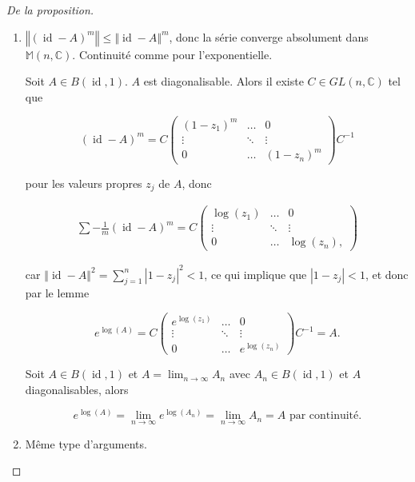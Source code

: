 \documentclass[french]{book}
\theoremstyle{definition}
\newcommand{\lesss}{<}
\newcommand{\less}{\lesss}
\begin{document}
\begin{proof}[De la proposition]

  \

  \begin{enumerate}
    \item \(\left\Vert (\operatorname{id} - A)^{m} \right\Vert \leq \left\Vert \operatorname{id} - A \right\Vert ^{m}\), donc la série converge absolument dans \(\mathbb{M}(n,\mathbb{C})\). Continuité comme pour l'exponentielle.

    Soit \(A \in B(\operatorname{id},1)\). \(A\) est diagonalisable. Alors il existe \(C \in GL(n,\mathbb{C})\) tel que

    \[(\operatorname{id} - A)^{m} = C \begin{pmatrix}
    (1 - z_1)^{m} & \dots & 0 \\
    \vdots & \ddots & \vdots \\
    0 & \dots & (1 - z_n)^{m}
    \end{pmatrix} C ^{-1}\]

    pour les valeurs propres \(z_j\) de \(A\), donc

    \begin{gather*}
      \sum -\frac{1}{m}(\operatorname{id} - A)^{m} = C \begin{pmatrix}
      \log(z_1) & \dots & 0 \\
      \vdots & \ddots & \vdots \\
      0 & \dots & \log(z_n),
      \end{pmatrix}
    \end{gather*}

    car \(\left\Vert \operatorname{id} - A \right\Vert ^{2} = \displaystyle\sum_{j=1}^{n} \left\lvert 1 - z_j \right\rvert ^2 \less 1\), ce qui implique que \(\left\lvert 1 - z_j \right\rvert \less 1\), et donc par le lemme

    \[e^{\log(A)} = C \begin{pmatrix}
    e^{\log(z_1)} & \dots & 0 \\
    \vdots & \ddots & \vdots \\
    0 & \dots & e^{\log(z_n)}
    \end{pmatrix}C ^{-1} = A.\]

    Soit \(A \in B(\operatorname{id},1)\) et \(A = \displaystyle \lim_{n \to \infty} A_n\) avec \(A_n \in B(\operatorname{id},1)\) et \(A\) diagonalisables, alors

    \[e^{\log(A)} = \lim_{n \to \infty} e^{\log(A_n)} = \lim_{n \to \infty} A_n = A \text{ par continuité}.\]

    \item Même type d'arguments.
  \end{enumerate}
\end{proof}
\end{document}
